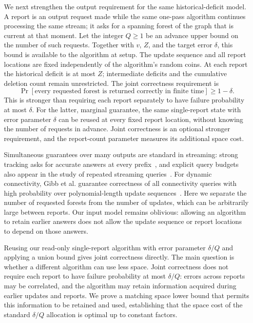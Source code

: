 \documentclass[11pt,letterpaper]{article}
\numberwithin{equation}{section}
\begin{document}
We next strengthen the output requirement for the same historical-deficit model.
A report is an output request made while the same one-pass algorithm continues processing the same stream; it asks for a spanning forest of the graph that is current at that moment.
Let the integer $Q\ge1$ be an advance upper bound on the number of such requests.
Together with $v$, $Z$, and the target error $\delta$, this bound is available to the algorithm at setup.
The update sequence and all report locations are fixed independently of the algorithm's random coins.
At each report the historical deficit is at most $Z$; intermediate deficits and the cumulative deletion count remain unrestricted.
The joint correctness requirement is
\[
 \Pr[\text{every requested forest is returned correctly in finite time}]
 \ge1-\delta.
\]
This is stronger than requiring each report separately to have failure probability at most $\delta$.
For the latter, marginal guarantee, the same single-report state with error parameter $\delta$ can be reused at every fixed report location, without knowing the number of requests in advance.
Joint correctness is an optional stronger requirement, and the report-count parameter measures its additional space cost.

Simultaneous guarantees over many outputs are standard in streaming: strong tracking asks for accurate answers at every prefix~\cite{BlasiokDingNelson2017Monitoring}, and explicit query budgets also appear in the study of repeated streaming queries~\cite{HassidimEtAl2020Robust}.
For dynamic connectivity, Gibb et al. guarantee correctness of all connectivity queries with high probability over polynomial-length update sequences~\cite{GibbKapronKingThorn2015}.
Here we separate the number of requested forests from the number of updates, which can be arbitrarily large between reports.
Our input model remains oblivious: allowing an algorithm to retain earlier answers does not allow the update sequence or report locations to depend on those answers.

Reusing our read-only single-report algorithm with error parameter $\delta/Q$ and applying a union bound gives joint correctness directly.
The main question is whether a different algorithm can use less space.
Joint correctness does not require each report to have failure probability at most $\delta/Q$: errors across reports may be correlated, and the algorithm may retain information acquired during earlier updates and reports.
We prove a matching space lower bound that permits this information to be retained and used, establishing that the space cost of the standard $\delta/Q$ allocation is optimal up to constant factors.
\end{document}
